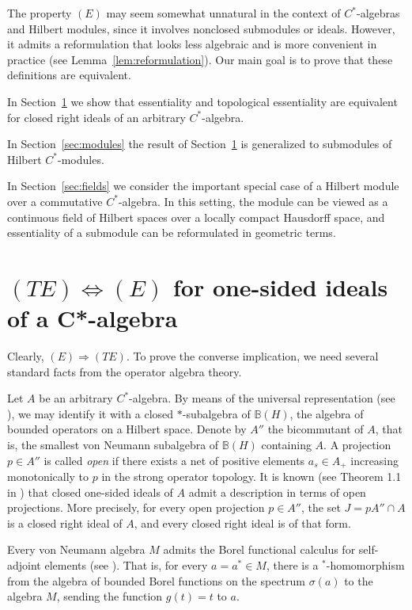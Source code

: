 \documentclass[reqno,a4paper,12pt]{amsart}
\theoremstyle{plain}
\theoremstyle{definition}
\begin{document}
	The property $(E)$ may seem somewhat unnatural in the context of $C^*$-algebras and Hilbert modules, since it involves nonclosed submodules or ideals.
	However, it admits a reformulation that looks less algebraic and is more convenient in practice (see Lemma~\ref{lem:reformulation}).
	Our main goal is to prove that these definitions are equivalent.
	
	In Section~\ref{sec:ideals} we show that essentiality and topological essentiality are equivalent for closed right ideals of an arbitrary $C^*$-algebra.
	
	In Section~\ref{sec:modules} the result of Section~\ref{sec:ideals} is generalized to submodules of Hilbert $C^*$-modules.
	
	In Section~\ref{sec:fields} we consider the important special case of a Hilbert module over a commutative $C^*$-algebra. In this setting, the module can be viewed as a continuous field of Hilbert spaces over a locally compact Hausdorff space, and essentiality of a submodule can be reformulated in geometric terms.
	
	\section{$(TE) \iff (E)$ for one-sided ideals of a C*-algebra}
	\label{sec:ideals}
	Clearly, $(E) \Rightarrow (TE)$. To prove the converse implication, we need several standard facts from the operator algebra theory.
	
	Let $A$ be an arbitrary $C^*$-algebra.
	By means of the universal representation (see \cite[Theorem I.9.12]{davidson}), we may identify it with a closed $*$-subalgebra of $\mathbb B(H)$, the algebra of bounded operators on a Hilbert space.
	Denote by $A''$ the bicommutant of $A$, that is, the smallest von Neumann subalgebra of $\mathbb B(H)$ containing $A$.
	A projection $p \in A''$ is called \textit{open} if there exists a net of positive elements $a_s \in A_{+}$ increasing monotonically to $p$ in the strong operator topology.
	It is known (see Theorem 1.1 in \cite{pedersen}) that closed one-sided ideals of $A$ admit a description in terms of open projections.
	More precisely, for every open projection $p \in A''$, the set $J = pA'' \cap A$ is a closed right ideal of $A$, and every closed right ideal is of that form.
	
	Every von Neumann algebra $M$ admits the Borel functional calculus for self-adjoint elements (see \cite[Corollary II.2.6]{davidson}).
	That is, for every $a = a^* \in M$, there is a $^*$-homomorphism from the algebra of bounded Borel functions on the spectrum $\sigma(a)$ to the algebra $M$, sending the function $g(t) = t$ to $a$.
	
\end{document}
